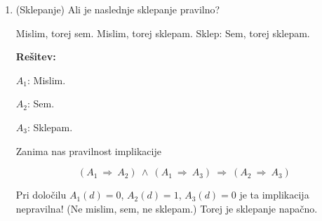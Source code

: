 \documentclass[11pt,paper=b5,DIV=13,headinclude,footinclude]{scrbook}
\def\ali {{~\vee~}}
\def\inn {{~\wedge~}}
\def\sledi {{~\Rightarrow~}}
\def\cee {{~\Leftrightarrow~}}
\begin{document}
\begin{enumerate}
V izjavo $C_1$ vstavimo $A(d) = 1$ in $C(d) = 0$, dobimo:
$\neg(\neg B\sledi 1)$,

$\neg(B\ali 1)$,

$\neg 1$, to pa je nepravilna izjava.

Torej 1.~primer ni mogoč.
%
%
%
%
%
%

\textbf{2.~primer: $A(d) = 0$.}

Zaradi $A_1$ je bodisi $C(d) = 1$ ali pa $D(d) = 1$.

\textbf{2.1.: $C(d) = 1$}.

Zaradi $C_1$ je $\neg B \sledi 0$, torej je $\neg B = 0$ in posledično $B(d) = 1$.

V izjavo $B_1$ vstavimo $A(d) = 0$, $B(d) = 1$, $C(d) = 1$, dobimo:

$1 \inn \neg D\sledi 0$

$\neg D\sledi 0$

Sledi $\neg D = 0$ oz.~$D(d) = 1$.

Vstavimo v izjavo $D_1$ znane vrednosti:

$(\neg E \sledi 0 \inn 0)$

Sledi $E(d) = 1$.

\bigskip

\textbf{2.2.: $C(d) = 0$ in $D(d) = 1$}.

Iz izjave $B_1$ dobimo $B(d) = 1$.

Izjava $C_1$ pa je sedaj nepravilna:
$0 \cee (0\sledi 1)$.\qed

Torej so $B$, $C$, $D$ in $E$ vitezi, $A$ pa je oproda.


\bigskip
\item (Sklepanje)
Ali je naslednje sklepanje pravilno?

Mislim, torej sem. Mislim, torej sklepam. Sklep: Sem, torej sklepam.


\textbf{Rešitev:}

$A_1$: Mislim.

$A_2$: Sem.

$A_3$: Sklepam.

Zanima nas pravilnost implikacije

$$(A_1\sledi A_2)\inn(A_1\sledi A_3)\sledi(A_2\sledi A_3)$$

Pri določilu $A_1(d) = 0$, $A_2(d) = 1$, $A_3(d) = 0$ je ta implikacija nepravilna!
(Ne mislim, sem, ne sklepam.)
Torej je sklepanje napačno.


\end{enumerate}
\end{document}
